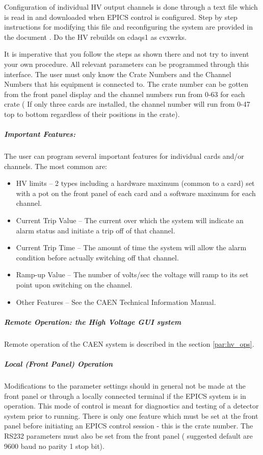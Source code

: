 Configuration of individual HV output channels is done through a
text file which is read in and downloaded when EPICS control is
configured. Step by step instructions for modifying this file and
reconfiguring the system are provided in the document
. Do the HV rebuilds on cdaqs1 as cvxwrks.


It is imperative that
you follow the steps as shown there and not try to invent your own
procedure.
All relevant parameters
can be programmed through this interface.  The user must only know the
Crate Numbers and the Channel Numbers that his equipment is connected
to.  The crate number can be gotten from the front panel display and the
channel numbers run from 0-63 for each crate ( If only three cards are
installed, the channel number will run from 0-47 top to bottom
regardless of their positions in the crate).

\subparagraph{Important Features:}

The user can program several important features for individual
cards and/or channels.  The most common are:

\begin{itemize}
\item{HV limits -- 2 types including a hardware maximum (common to a
card) set with a pot on the front panel of each card and a software
maximum for each channel.}
\item{Current Trip Value -- The current over which the system will
indicate an alarm status and initiate a trip off of that channel.}
\item{Current Trip Time -- The amount of time the system will allow
the alarm condition before actually switching off that channel.}
\item{Ramp-up Value -- The number of volts/sec the voltage will ramp
to its set point upon switching on the channel.}
\item{Other Features -- See the CAEN Technical Information Manual.}
\end{itemize}

\subparagraph{Remote Operation: the High Voltage GUI system}
Remote operation of the CAEN system is described in the section
\ref{par:hv_ops}.

\subparagraph{Local (Front Panel) Operation}

Modifications to the parameter settings should in general not be
made at the front panel or through a locally connected terminal if the
EPICS system is in operation.  This mode of control is meant for
diagnostics and testing of a detector system prior to running.  There is
only one feature which must be set at the front panel before initiating
an EPICS control session - this is the crate number.  The RS232
parameters must also be set from the front panel ( suggested default are
9600 baud  no parity  1 stop bit).


